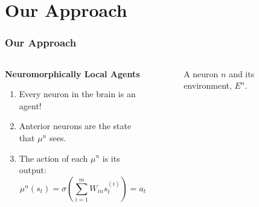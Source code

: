 \documentclass{beamer}
\newcommand*{\Scale}[2][4]{\scalebox{#1}{$#2$}}%
\numberwithin{equation}{subsection}
\numberwithin{theorem}{subsection}
\begin{document}
\section{Our Approach} %
\begin{frame}
  \frametitle{Our Approach}
      \begin{columns}
      \begin{column}{0.6\textwidth}

  \textbf{Neuromorphically Local Agents}
  \begin{enumerate}

    \item Every neuron in the brain is an agent!
    \item Anterior neurons are the state that $\mu^n$ sees.
    \item The action of each $\mu^n$ is its output:
    \begin{equation*}
      \mu^n(s_t) = \sigma\left(\sum_{i=1}^m W_{in}s_t^{(i)}   \right) = a_t
    \end{equation*}
  \end{enumerate}
      \end{column}
      \begin{column}{0.4\textwidth}
      \begin{figure}
          \begin{centering}

          \end{centering}
          \caption{A neuron $n$ and its environment, $E^n$.}
      \end{figure}

      \end{column}
    \end{columns}

\end{frame}
\end{document}
